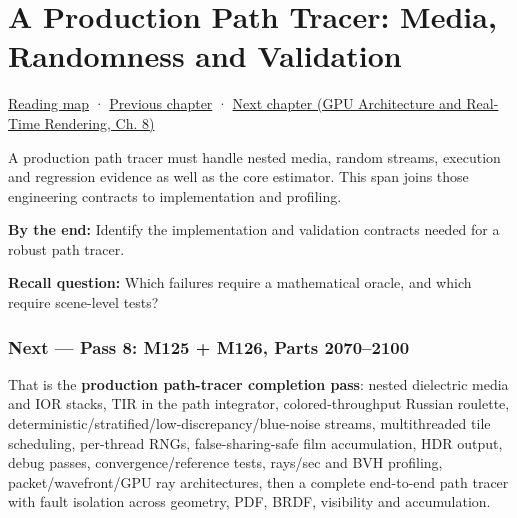 \chapter{A Production Path Tracer: Media, Randomness and Validation}\label{03-visual-computing-i-ch010-a-production-path-tracer-media-randomness-and-validation}\hypertarget{03-visual-computing-i-ch010}{}\label{stagechapter:03-visual-computing-i-ch010}

\hypertarget{03-visual-computing-i-ch010-a-production-path-tracer-media-randomness-and-validation}{}

\hyperref[volume-reading-map]{Reading map} · \hyperref[03-visual-computing-i-ch009-point-lights-mis-and-environment-lighting]{Previous chapter} · \href{../06-GPU-Architecture-and-Real-Time-Rendering/main.pdf\#nameddest=03-visual-computing-i-ch011-bvh-traversal-and-deterministic-evidence}{Next chapter (GPU Architecture and Real-Time Rendering, Ch. 8)}

A production path tracer must handle nested media, random streams, execution and regression evidence as well as the core estimator. This span joins those engineering contracts to implementation and profiling.

\textbf{By the end:} Identify the implementation and validation contracts needed for a robust path tracer.

\textbf{Recall question:} Which failures require a mathematical oracle, and which require scene-level tests?

\subsection{Next --- Pass 8: M125 + M126, Parts 2070--2100}\label{03-visual-computing-i-ch010-next-pass-8-m125-m126-parts-20702100}

\hypertarget{03-visual-computing-i-ch010-next-pass-8-m125-m126-parts-20702100}{}

That is the \textbf{production path-tracer completion pass}: nested dielectric media and IOR stacks, TIR in the path integrator, colored-throughput Russian roulette, deterministic/stratified/low-discrepancy/blue-noise streams, multithreaded tile scheduling, per-thread RNGs, false-sharing-safe film accumulation, HDR output, debug passes, convergence/reference tests, rays/sec and BVH profiling, packet/wavefront/GPU ray architectures, then a complete end-to-end path tracer with fault isolation across geometry, PDF, BRDF, visibility and accumulation.

